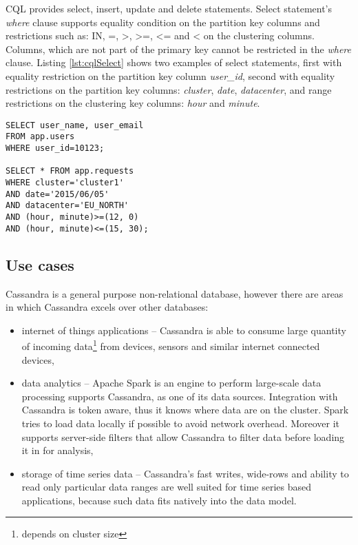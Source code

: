 CQL provides select, insert, update and delete statements. Select statement's \emph{where} clause supports equality condition on the partition key columns and restrictions such as: IN, =, >, >=, <= and < on the clustering columns. Columns, which are not part of the primary key cannot be restricted in the \emph{where} clause. Listing \ref{lst:cqlSelect} shows two examples of select statements, first with equality restriction on the partition key column \emph{user_id}, second with equality restrictions on the partition key columns: \emph{cluster}, \emph{date}, \emph{datacenter}, and range restrictions on the clustering key columns: \emph{hour} and \emph{minute}.

\begin{lstlisting}[style=outcode,label={lst:cqlSelect},caption={Examples of CQL select statements}]
SELECT user_name, user_email 
FROM app.users 
WHERE user_id=10123;
    
SELECT * FROM app.requests
WHERE cluster='cluster1'
AND date='2015/06/05'
AND datacenter='EU_NORTH'
AND (hour, minute)>=(12, 0) 
AND (hour, minute)<=(15, 30);
\end{lstlisting}

 
\subsection{Use cases}
Cassandra is a general purpose non-relational database, however there are areas in which Cassandra excels over other databases:
\begin{itemize}
\item internet of things applications -- Cassandra is able to consume large quantity of incoming data\footnote{depends on cluster size} from devices, sensors and similar internet connected devices,
\item data analytics -- Apache Spark is an engine to perform large-scale data processing \cite{ApacheSpark} supports Cassandra, as one of its data sources.
Integration with Cassandra is token aware, thus it knows where data are on the cluster. Spark tries to load data locally if possible to avoid network overhead. Moreover it supports server-side filters that allow Cassandra to filter data before loading it in for analysis,
\item storage of time series data -- Cassandra's fast writes, wide-rows and ability to read only particular data ranges are well suited for time series based applications, because such data fits natively into the data model.
\end{itemize} 

